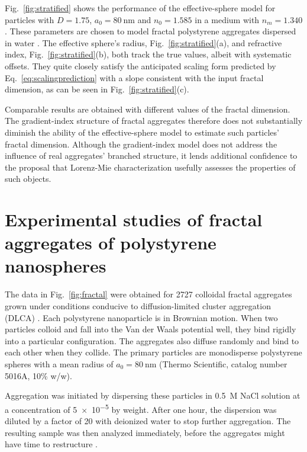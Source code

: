 Fig.~\ref{fig:stratified} shows the performance 
of the effective-sphere model 
for particles with $D = \num{1.75}$, $a_0 = \SI{80}{\nm}$ and $n_0 = \num{1.585}$
in a medium with $n_m = \num{1.340}$.
These parameters are chosen to model fractal polystyrene aggregates
dispersed in water \cite{majolino89,zhou91,wu13}.
The effective sphere's radius, Fig.~\ref{fig:stratified}(a), 
and refractive index, Fig.~\ref{fig:stratified}(b),
both track the true values, albeit with systematic offsets.
They quite closely satisfy the anticipated scaling form predicted
by Eq.~\eqref{eq:scalingprediction} with a slope consistent
with the input fractal dimension, as can be seen in
Fig.~\ref{fig:stratified}(c).

Comparable results are obtained with different values of the
fractal dimension.
The gradient-index structure of fractal aggregates therefore does
not substantially diminish the ability of the effective-sphere model
to estimate such particles' fractal dimension.
Although the gradient-index model does not address the influence
of real aggregates' branched structure, it lends additional confidence
to the proposal that Lorenz-Mie characterization usefully assesses
the properties of such objects.

\section{Experimental studies of fractal aggregates of polystyrene nanospheres}
\label{sec:psaggregates}

The data in Fig.~\ref{fig:fractal} were obtained for \num{2727}
colloidal fractal aggregates grown under conditions conducive
to diffusion-limited cluster aggregation (DLCA) \cite{meakin88,majolino89,zhou91}. Each polystyrene nanoparticle is in Brownian motion. When two particles colloid and fall into the Van der Waals potential well, they bind rigidly into a particular configuration. The aggregates also diffuse randomly and bind to each other when they collide.
The primary particles are monodisperse polystyrene spheres with
a mean radius of $a_0 = \SI{80}{\nm}$ 
(Thermo Scientific, catalog number 5016A, 10\% w/w).

Aggregation was initiated by dispersing these particles in
\SI{0.5}{M} NaCl solution at a concentration of
\num{5e-5} by weight.
After one hour, the dispersion was diluted by a factor of \num{20}
with deionized water to stop further aggregation.
The resulting sample was then analyzed immediately, before
the aggregates might have time to restructure \cite{aubert86,zhou91}.

